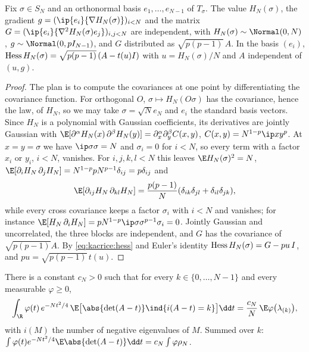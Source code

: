 \begin{refsection}
\begin{lemma}\label{lem:kacrice:regression}
Fix $\sigma\in S_N$ and an orthonormal basis $e_1,\dots,e_{N-1}$ of $T_\sigma$. The value $H_N(\sigma)$, the gradient $g=(\ip{e_i}{\nabla H_N(\sigma)})_{i<N}$ and the matrix $G=(\ip{e_i}{\nabla^2H_N(\sigma)e_j})_{i,j<N}$ are independent, with $H_N(\sigma)\sim\Normal(0,N)$, $g\sim\Normal(0,pI_{N-1})$, and $G$ distributed as $\sqrt{p(p-1)}\,A$. In the basis $(e_i)$, $\operatorname{Hess} H_N(\sigma)=\sqrt{p(p-1)}\,(A-t(u)I)$ with $u=H_N(\sigma)/N$ and $A$ independent of $(u,g)$.
\end{lemma}

\begin{proof}
The plan is to compute the covariances at one point by differentiating the covariance function. For orthogonal $O$, $\sigma\mapsto H_N(O\sigma)$ has the covariance, hence the law, of $H_N$, so we may take $\sigma=\sqrt Ne_N$ and $e_i$ the standard basis vectors. Since $H_N$ is a polynomial with Gaussian coefficients, its derivatives are jointly Gaussian with $\E[\partial^\alpha H_N(x)\,\partial^\beta H_N(y)]=\partial_x^\alpha\partial_y^\beta C(x,y)$, $C(x,y)=N^{1-p}\ip xy^p$. At $x=y=\sigma$ we have $\ip\sigma\sigma=N$ and $\sigma_i=0$ for $i<N$, so every term with a factor $x_i$ or $y_i$, $i<N$, vanishes. For $i,j,k,l<N$ this leaves $\E H_N(\sigma)^2=N$, $\E[\partial_iH_N\,\partial_jH_N]=N^{1-p}pN^{p-1}\delta_{ij}=p\delta_{ij}$ and
\[
\E[\partial_{ij}H_N\,\partial_{kl}H_N]=\frac{p(p-1)}N(\delta_{ik}\delta_{jl}+\delta_{il}\delta_{jk}),
\]
while every cross covariance keeps a factor $\sigma_i$ with $i<N$ and vanishes; for instance $\E[H_N\,\partial_iH_N]=pN^{1-p}\ip\sigma\sigma^{p-1}\sigma_i=0$. Jointly Gaussian and uncorrelated, the three blocks are independent, and $G$ has the covariance of $\sqrt{p(p-1)}A$. By \eqref{eq:kacrice:hess} and Euler's identity $\operatorname{Hess} H_N(\sigma)=G-pu\,I$, and $pu=\sqrt{p(p-1)}\,t(u)$.
\end{proof}

\begin{lemma}\label{lem:kacrice:extra}
There is a constant $c_N>0$ such that for every $k\in\{0,\dots,N-1\}$ and every measurable $\varphi\ge0$,
\begin{equation}\label{eq:kacrice:extra}
\int_\R\varphi(t)\,e^{-Nt^2/4}\,\E\bigl[\abs{\det(A-t)}\ind\{i(A-t)=k\}\bigr]\dd t=\frac{c_N}N\,\E\varphi\bigl(\lambda_{(k)}\bigr),
\end{equation}
with $i(M)$ the number of negative eigenvalues of $M$. Summed over $k$: $\int\varphi(t)e^{-Nt^2/4}\E\abs{\det(A-t)}\dd t=c_N\int\varphi\rho_N$.
\end{lemma}


\end{refsection}
